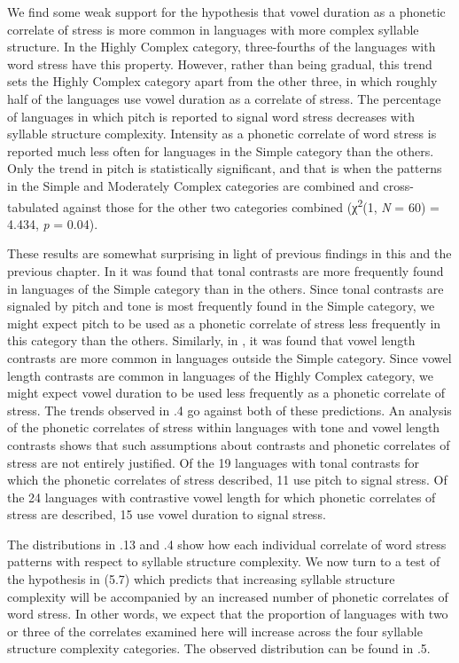   We find some weak support for the hypothesis that vowel duration as a phonetic correlate of stress is more common in languages with more complex syllable structure. In the Highly Complex category, three-fourths of the languages with word stress have this property. However, rather than being gradual, this trend sets the Highly Complex category apart from the other three, in which roughly half of the languages use vowel duration as a correlate of stress. The percentage of languages in which pitch is reported to signal word stress decreases with syllable structure complexity. Intensity as a phonetic correlate of word stress is reported much less often for languages in the Simple category than the others. Only the trend in pitch is statistically significant, and that is when the patterns in the Simple and Moderately Complex categories are combined and cross-tabulated against those for the other two categories combined (χ\textsuperscript{2}(1, \textit{N} = 60) = 4.434, \textit{p} = 0.04).

  These results are somewhat surprising in light of previous findings in this and the previous chapter. In  it was found that tonal contrasts are more frequently found in languages of the Simple category than in the others. Since tonal contrasts are signaled by pitch and tone is most frequently found in the Simple category, we might expect pitch to be used as a phonetic correlate of stress less frequently in this category than the others. Similarly, in , it was found that vowel length contrasts are more common in languages outside the Simple category. Since vowel length contrasts are common in languages of the Highly Complex category, we might expect vowel duration to be used less frequently as a phonetic correlate of stress. The trends observed in .4 go against both of these predictions. An analysis of the phonetic correlates of stress within languages with tone and vowel length contrasts shows that such assumptions about contrasts and phonetic correlates of stress are not entirely justified. Of the 19 languages with tonal contrasts for which the phonetic correlates of stress described, 11 use pitch to signal stress. Of the 24 languages with contrastive vowel length for which phonetic correlates of stress are described, 15 use vowel duration to signal stress. 

  The distributions in .13 and .4 show how each individual correlate of word stress patterns with respect to syllable structure complexity. We now turn to a test of the hypothesis in (5.7) which predicts that increasing syllable structure complexity will be accompanied by an increased number of phonetic correlates of word stress. In other words, we expect that the proportion of languages with two or three of the correlates examined here will increase across the four syllable structure complexity categories. The observed distribution can be found in .5.

